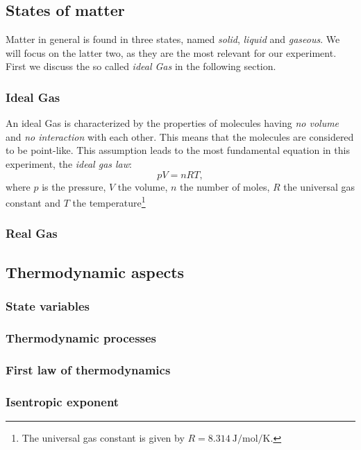 \documentclass{subfiles}
\begin{document}
    \subsection{States of matter}

        Matter in general is found in three states, named \emph{solid}, \emph{liquid} and \emph{gaseous}. We will focus on the latter two, as they are the most relevant for our experiment. First we discuss the so called \emph{ideal Gas} in the following section. 

        \subsubsection*{Ideal Gas}
            An ideal Gas is characterized by the properties of molecules having \emph{no volume} and \emph{no interaction} with each other. This means that the molecules are considered to be point-like. This assumption leads to the most fundamental equation in this experiment, the \emph{ideal gas law}:
            \[
                pV = nRT,
            \]
            where $p$ is the pressure, $V$ the volume, $n$ the number of moles, $R$ the universal gas constant and $T$ the temperature\footnote{The universal gas constant is given by $R = \SI{8.314}{\joule\per\mole\per\kelvin}$. }
        \subsubsection*{Real Gas}
    
    \subsection{Thermodynamic aspects}
    
        \subsubsection*{State variables}

        \subsubsection*{Thermodynamic processes}

        \subsubsection*{First law of thermodynamics}

        \subsubsection*{Isentropic exponent}
\end{document}

